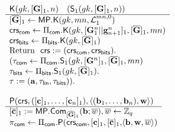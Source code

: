 \begin{figure}
\begin{\algSize}
$$
\begin{array}{l}
\begin{array}{l}
\algK(\gk,[\matr{G}]_1,n)\quad (\mathsf{S}_1(\gk,[\matr{G}]_1,n))\\
\hline
{[\overline{\matr{G}}]_1 \gets \MP.\algK(gk,mn,\distlin_1^{mn,0})}\\
\crs_\sfcom\gets\Pi_\sfcom.\algK(\gk,[\vecb{G}^n_1||\vecb{g}_{n+1}^n]_1,[\ovG]_1, mn)\\
\crs_\sfbits\gets\Pi_\sfbits.\algK(\gk,[\overline{\matr{G}}]_1)\\
\text{Return } \ \mathsf{crs}:=(\crs_\sfcom,\crs_\sfbits).\\
(\tau_\sfcom\gets\Pi_\sfcom.\mathsf{S}_1(\gk,[\matr{G}^n]_1,[\ovG]_1,mn)\\
\tau_\sfbits\gets\Pi_\sfbits.\mathsf{S}_1(\gk,[\overline{\matr{G}}]_1).\\
\tau := (\vecb{a},\tau_\sflin,\tau_\sfbits)).\\
\\
\end{array}
\\
\begin{array}{l}
{\algP(\mathsf{crs}, ([\vecb{c}]_1,\ldots,[\vecb{c}_n]_1), \langle (\vecb{b}_1,\ldots,\vecb{b}_n), \vecb{w}\rangle)}\\
\hline
{[\ovecb{c}]_1 :=\MP.\Com_{[\ovG]_1}(\vecb{b};\overline{w})},\overline{w}\gets\Z_q\\
{\pi_\sfcom \gets \Pi_{\sfcom}.\algP(\crs_\sfcom,[\vecb{c}]_1,[\ovecb{c}]_1,}{\langle\vecb{b},\vecb{w},\overline{w}\rangle)}\\

\end{array}
\end{array}$$
\end{\algSize}
\end{figure}
